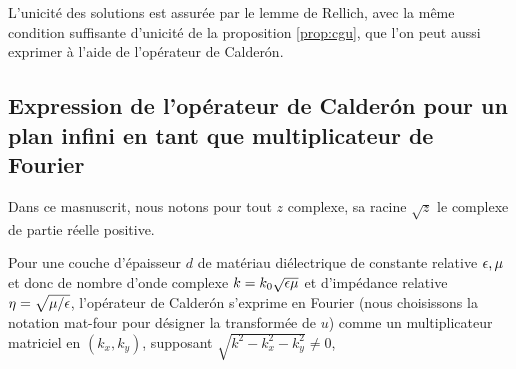     

  L'unicité des solutions est assurée par le lemme de Rellich, avec la même condition suffisante d'unicité de la proposition \ref{prop:cgu}, que l'on peut aussi exprimer à l'aide de l'opérateur de Calderón.

  \subsection{Expression de l'opérateur de Calderón pour un plan infini en tant que multiplicateur de Fourier}

    \begin{remark}
      Dans ce masnuscrit, nous notons pour tout \(z\) complexe, sa racine \(\sqrt{z}\) le complexe de partie réelle positive.
    \end{remark}

    Pour une couche d'épaisseur \(d\) de matériau diélectrique de constante relative \(\epsilon,\mu\) et donc de nombre d'onde complexe \(k = k_0\sqrt{\epsilon\mu}\) et d'impédance relative \(\eta=\sqrt{{\mu}/{\epsilon}}\), l'opérateur de Calderón s'exprime en Fourier (nous choisissons la notation \gls{mat-four} pour désigner la transformée de \(u\)) comme un multiplicateur matriciel en \((k_x,k_y)\), supposant \(\sqrt{k^2-k_x^2-k_y^2}\not=0\), 

